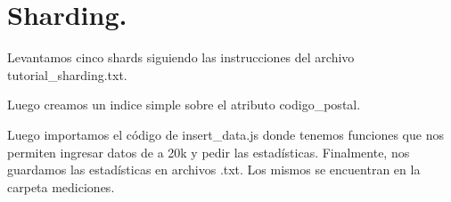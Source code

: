 \section{Sharding.}
Levantamos cinco shards siguiendo las instrucciones del archivo tutorial\_sharding.txt.

Luego creamos un indice simple sobre el atributo codigo\_postal.

Luego importamos el código de insert\_data.js donde tenemos
funciones que nos permiten ingresar datos de a 20k y pedir las estadísticas.
Finalmente, nos guardamos las estadísticas en archivos .txt. Los mismos se encuentran en
la carpeta mediciones.